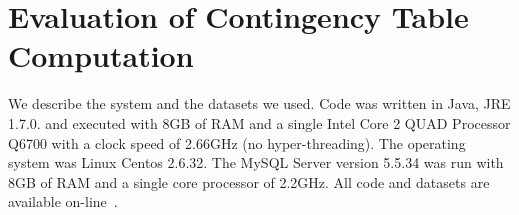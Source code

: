 \documentclass{sig-alternate-2013}
\begin{document}
\section{Evaluation of Contingency Table Computation} 
We describe the system and the datasets we used.
Code was written in Java, JRE 1.7.0.  and executed with 8GB of RAM and a single Intel Core 2 QUAD Processor Q6700 with a clock speed of 2.66GHz (no hyper-threading). The operating system was Linux Centos 2.6.32. 
The MySQL Server version 5.5.34 was run with 8GB of RAM and a single core processor of 2.2GHz. 
All code and datasets are available on-line~\cite{bib:jbnsite}.%
%
\end{document}
